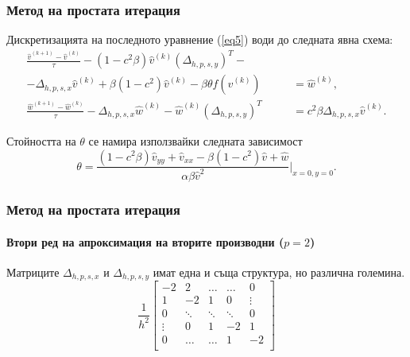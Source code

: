 \documentclass{beamer}
\newcommand{\rf}[1]{(\ref{#1})}
\begin{document}
\begin{frame}
\frametitle{Метод на простата итерация} 
Дискретизацията на последното уравнение \rf{eq5} води до следната явна схема:
\begin{equation}\label{eq555}
\begin{split}
\frac {\widehat{v}^{(k+1)}-\widehat{v}^{(k)}}{\tau}- (1-c^2 \beta) \widehat{v}^{(k)}  (\Delta_{h,p,s,y})^T - \quad\quad\quad\;&\\
-\Delta_{h,p,s,x}  \widehat{v}^{(k)}+ \beta (1-c^2 ) \widehat{v}^{(k)} - \beta \theta f(\widehat{v}^{(k)}) &= \widehat{w}^{(k)}, \\
\frac  {\widehat{w}^{(k+1)} -\widehat{w}^{(k)}} {\tau} - \Delta_{h,p,s,x}  \widehat{w}^{(k)} - \widehat{w}^{(k)}  (\Delta_{h,p,s,y})^T &=  c^2 \beta \Delta_{h,p,s,x}  \widehat{v}^{(k)}.
\end{split}
\end{equation}

Стойността на $\theta$ се намира използвайки следната зависимост
\begin{equation}\label{eqtheta}
\theta = \frac{ (1-c^2 \beta) \widehat{v}_{yy} + \widehat{v}_{xx} - \beta (1-c^2) \widehat{v} +\widehat{w}}{\alpha \beta \widehat{v}^2 } |_{x=0,y=0}.
\end{equation}
\end{frame}


\begin{frame}
\frametitle{Метод на простата итерация}
\framesubtitle{Втори ред на апроксимация на вторите производни ($p=2$)}
Матриците $\Delta_{h,p,s,x}$ и $\Delta_{h,p,s,y}$ имат една и съща структура, но различна големина.
\[
\frac{1}{h^2}
\begin{bmatrix}
    -2	       & 2        &     \dots   &   \dots        & 0   \\
    1               & -2            &   1           &   0               & \vdots    \\
        0           & \ddots        &    \ddots    &   \ddots       &  0 \\ 
    \vdots       &     0            &  1     	& -2    	   & 1 \\
    0               & \dots          &  \dots         & 1  	   & -2 \\
\end{bmatrix}
\]
\end{frame}
\end{document}
